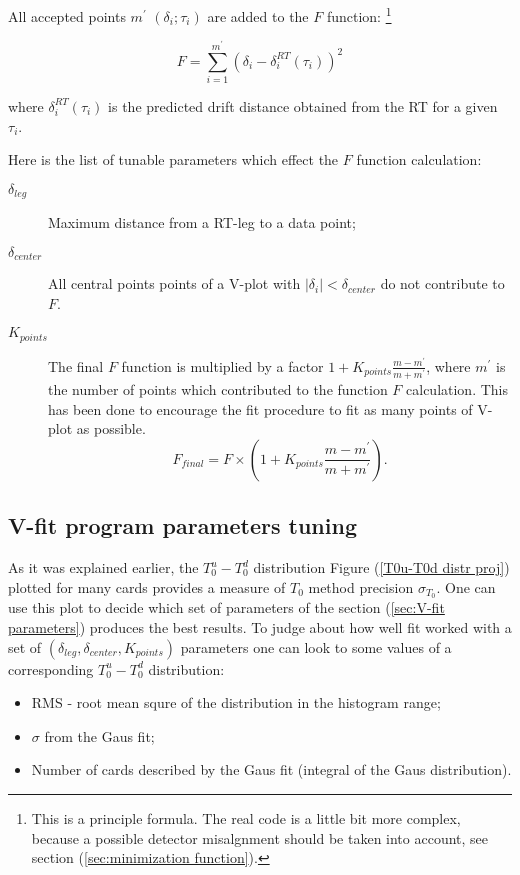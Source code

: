 \documentclass[a4paper,12pt]{article}
\begin{document}
All accepted points $m^\prime$ $(\delta_i;\tau_i)$ are added to the $F$ function:
\footnote{This is a principle formula. The real code is a little bit more complex, because
a possible detector misalgnment should be taken into account, see section (\ref{sec:minimization function}).}

$$
    F = \sum_{i=1}^{m^\prime}{(\delta_i-\delta_i^{RT}(\tau_i))^2}
$$

where $\delta_i^{RT}(\tau_i)$ is the predicted drift distance obtained from the
RT for a given $\tau_i$.

Here is the list of tunable parameters which effect the $F$ function calculation:
\begin{description}
\item[$\delta_{leg}$] Maximum distance from a RT-leg to a data point;
\item[$\delta_{center}$] All central points points of a V-plot with $|\delta_i|<\delta_{center}$
                         do not contribute to $F$.
\item[$K_{points}$]   The final $F$ function is multiplied by a factor $1+K_{points}\frac{m-m^\prime}{m+m^\prime}$,
                      where $m^\prime$ is the number of points which contributed to the function $F$ calculation.
                      This has been done to encourage the fit procedure to fit as many points of V-plot
                      as possible. $$ F_{final} = F \times \left(1+K_{points}\frac{m-m^\prime}{m+m^\prime} \right).$$
\end{description}

\subsection{V-fit program parameters tuning}
As it was explained earlier, the $T_0^u-T_0^d$ distribution Figure (\ref{T0u-T0d distr proj})
plotted for many cards
provides a measure of $T_0$ method precision $\sigma_{T_0}$. One can use this plot to decide
which set of parameters of the section (\ref{sec:V-fit parameters}) produces the best results.
To judge about how well fit worked with a set of $(\delta_{leg},\delta_{center},K_{points})$
parameters one can look to some values of a corresponding $T_0^u-T_0^d$ distribution:

\begin{itemize}
\item RMS - root mean squre of the distribution in the histogram range;
\item $\sigma$ from the Gaus fit;
\item Number of cards described by the Gaus fit (integral of the Gaus distribution).
\end{itemize}
\end{document}
